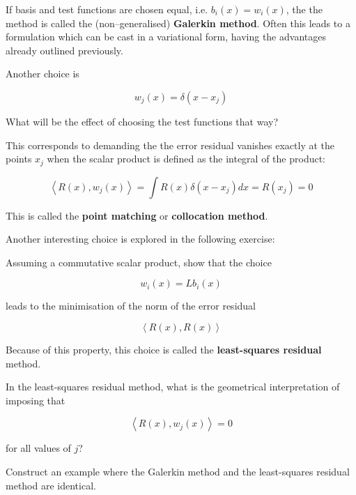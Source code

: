 If basis and test functions are chosen equal, i.e. $b_i(x) = w_i(x)$, the the method is called the (non--generalised) \textbf{Galerkin method}. Often this leads to a formulation which can be cast in a variational form, having the advantages already outlined previously.

Another choice is

\begin{equation}
w_j(x) = \delta(x-x_j)
\end{equation} 

\begin{cue}
What will be the effect of choosing the test functions that way?  
\end{cue}

This corresponds to demanding the the error residual vanishes exactly at the points $x_j$ when the scalar product is defined as the integral of the product:

\begin{equation}
\left\langle R(x), w_j(x) \right\rangle = \int R(x) \delta(x-x_j) dx = R(x_j) = 0
\end{equation} 

This is called the \textbf{point matching} or \textbf{collocation method}.

Another interesting choice is explored in the following exercise:

\begin{exer}
Assuming a commutative scalar product, show that the choice 

$$w_i(x) = L b_i(x)$$

leads to the minimisation of the norm of the error residual 

$$\left\langle R(x), R(x) \right\rangle$$ 

Because of this property, this choice is called the \textbf{least-squares residual} method.
\end{exer}

\pagebreak

\begin{exer}
In the least-squares residual method, what is the geometrical interpretation of imposing that 

$$\left\langle R(x), w_j(x) \right\rangle = 0$$ 

for all values of $j$?
\end{exer}



\begin{exer}
Construct an example where the Galerkin method and the least-squares residual method are identical.
\end{exer}



